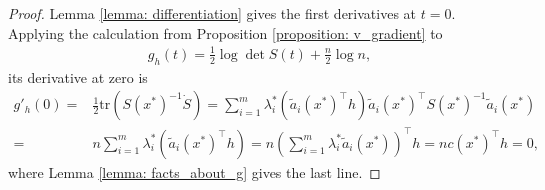 \documentclass[10pt,a4paper]{amsart}
\newcommand{\tr}{\mathrm{tr}}
\begin{document}
\begin{proof}
    Lemma \ref{lemma: differentiation} gives the first derivatives at $t=0$.
    Applying the calculation from Proposition \ref{proposition: v_gradient} to
    \begin{align}\label{eq: g_h_in_t}
        g_h(t) = \frac{1}{2}\log \det S(t) + \frac{n}{2} \log n,
    \end{align}
    its derivative at zero is
    \begin{align*}
        g'_h(0) = & \frac{1}{2}\tr(S(x^*)^{-1}\dot{S})
        = \sum_{i=1}^m \lambda_i^* (\tilde{a}_i(x^*)^\top h)\tilde{a}_i(x^*) ^\top S(x^*)^{-1}\tilde{a}_i(x^*) \\
        = & n\sum_{i=1}^m \lambda_i^* (\tilde{a}_i(x^*)^\top h) =  n \left(\sum_{i=1}^m \lambda_i^* \tilde{a}_i(x^*)\right)^\top h = n c(x^*)^\top h =0,
    \end{align*}
    where Lemma \ref{lemma: facts_about_g} gives the last line.


\end{proof}
\end{document}
